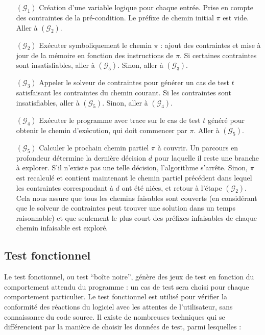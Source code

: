 \begin{itemize}
\item[$(\mathcal{G}_1)$]
Création d'une variable logique pour chaque entrée.
Prise en compte des contraintes de la pré-condition.
Le préfixe de chemin initial $\pi$ est vide.
Aller à $(\mathcal{G}_2)$.

\item[$(\mathcal{G}_2)$]
Exécuter symboliquement le chemin $\pi$ : ajout des contraintes et
mise à jour de la mémoire en fonction des instructions de $\pi$.
Si certaines contraintes sont insatisfiables, aller à $(\mathcal{G}_5)$.
Sinon, aller à $(\mathcal{G}_3)$.

\item[$(\mathcal{G}_3)$]
Appeler le solveur de contraintes pour générer un cas de test $t$ satisfaisant
les contraintes du chemin courant. Si les contraintes sont insatisfiables, aller
à $(\mathcal{G}_5)$.
Sinon, aller à $(\mathcal{G}_4)$.

\item[$(\mathcal{G}_4)$]
Exécuter le programme avec trace sur le cas de test $t$ généré pour obtenir
le chemin d'exécution, qui doit commencer par $\pi$.
Aller à $(\mathcal{G}_5)$.

\item[$(\mathcal{G}_5)$]
Calculer le prochain chemin partiel $\pi$ à couvrir. Un parcours en profondeur
détermine la dernière décision $d$ pour laquelle il reste une branche à
explorer. S'il n'existe pas une telle décision, l'algorithme s'arrête. Sinon,
$\pi$ est recalculé et contient maintenant le chemin partiel précédent dans
lequel les contraintes correspondant à $d$ ont été niées, et retour à l'étape
$(\mathcal{G}_2)$. Cela nous assure que tous les chemins faisables sont couverts
(en considérant que le solveur de contraintes peut trouver une solution dans un
temps raisonnable) et que seulement le plus court des préfixes infaisables de
chaque chemin infaisable est exploré.
\end{itemize}


\subsection{Test fonctionnel}
\label{sec:test-fonctionnel}

Le test fonctionnel, ou test ``boîte noire'', génère des jeux de test en
fonction du comportement attendu du programme : un cas de test sera choisi pour
chaque comportement particulier. Le test fonctionnel est utilisé pour vérifier
la conformité des réactions du logiciel avec les attentes de l'utilisateur, sans
connaissance du code source. Il existe de nombreuses techniques qui se
différencient par la manière de choisir les données de test, parmi lesquelles :

